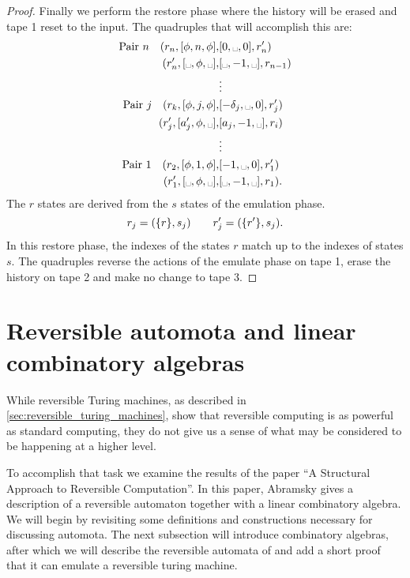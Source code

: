 \begin{proof}
  Finally we perform the restore phase where the history will be erased and tape 1 reset to the
  input. The quadruples that will accomplish this are:
  \begin{align*}
      \text{Pair }n \quad (r_n,[\phi,n,\phi],&[0,\blank,0],r'_n)\\
      (r'_n,[\blank,\phi,\blank],&[\blank,-1,\blank],r_{n-1})\\
      &\vdots\\
      \text{Pair }\jay \quad (r_\kay,[\phi,\jay,\phi],&[-\delta_\jay,\blank,0],r'_\jay)\\
      (r'_\jay,[a'_\jay,\phi,\blank],&[a_\jay,-1,\blank],r_i)\\
      &\vdots\\
      \text{Pair 1} \quad (r_2,[\phi,1,\phi],&[-1,\blank,0],r'_1)\\
      (r'_1,[\blank,\phi,\blank],&[\blank,-1,\blank],r_1).
  \end{align*}
  The $r$ states are derived from the $s$ states of the emulation phase.
  \[
    r_j = (\{r\},s_j) \qquad    r'_j = (\{r'\}, s_j).
  \]
  In this restore phase, the indexes of the states $r$ match up to the indexes of states $s$. The
  quadruples reverse the actions of the emulate phase on tape 1, erase the history on tape 2 and
  make no change to tape 3.

\end{proof}



\section{Reversible automota and linear combinatory algebras} %
\label{sec:reversible_automota_and_linear_combinatory_algebras}
While reversible Turing machines, as described in \vref{sec:reversible_turing_machines}, show that
reversible computing is as powerful as standard computing, they do not give us a sense of what may
be considered to be happening at a higher level.

To accomplish that task we examine the results of the paper ``A Structural Approach to Reversible
Computation''\cite{abramsky05:reversible}. In this paper, Abramsky gives a description of a
reversible automaton together with a linear combinatory algebra. We will begin by revisiting some
definitions and constructions necessary for discussing automota. The next subsection will introduce
combinatory algebras, after which we will describe the reversible automata of
\cite{abramsky05:reversible} and add a short proof that it can emulate a reversible turing machine.

